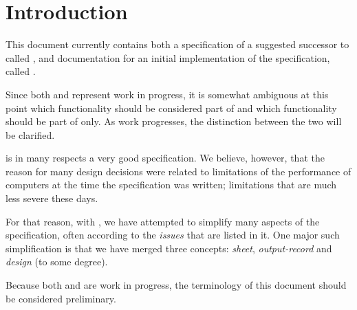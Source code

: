 \chapter{Introduction}

This document currently contains both a specification of a suggested
successor to \climtwo{} \cite{McKay:1991:CCL:114669.114675} called
\clim{}, and documentation for an initial implementation of the
\clim{} specification, called \sysname{}.

Since both \clim{} and \sysname{} represent work in progress, it is
somewhat ambiguous at this point which functionality should be
considered part of \clim{} and which functionality should be part of
\sysname{} only.  As work progresses, the distinction between the two
will be clarified. 

\climtwo{} is in many respects a very good specification.  We believe,
however, that the reason for many design decisions were related to
limitations of the performance of computers at the time the
specification was written; limitations that are much less severe these
days.

For that reason, with \clim{}, we have attempted to simplify many
aspects of the \climtwo{} specification, often according to the
\emph{issues} that are listed in it.  One major such simplification is
that we have merged three concepts: \emph{sheet}, \emph{output-record}
and \emph{design} (to some degree).

Because both \clim{} and \sysname{} are work in progress, the
terminology of this document should be considered preliminary.  



